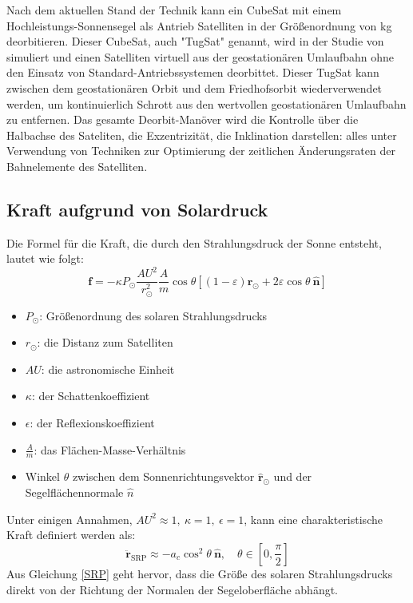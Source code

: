 Nach dem aktuellen Stand der Technik kann ein CubeSat mit einem Hochleistungs-Sonnensegel als Antrieb Satelliten in der Größenordnung von \unit[1000]{kg} deorbitieren. Dieser CubeSat, auch "TugSat" genannt, wird in der Studie  von \citet{Kelly:2018} simuliert und einen Satelliten virtuell aus der geostationären Umlaufbahn ohne den Einsatz von Standard-Antriebssystemen deorbittet. Dieser TugSat kann zwischen dem geostationären Orbit und dem Friedhofsorbit wiederverwendet werden, um kontinuierlich Schrott aus den wertvollen geostationären Umlaufbahn zu entfernen. Das gesamte Deorbit-Manöver wird die Kontrolle über die Halbachse des Sateliten, die Exzentrizität, die Inklination darstellen: alles unter Verwendung von Techniken zur Optimierung der zeitlichen Änderungsraten der Bahnelemente des Satelliten. 
\subsection{Kraft aufgrund von Solardruck}
Die Formel für die Kraft, die durch den Strahlungsdruck der Sonne entsteht, lautet wie folgt:
\begin{equation}
	\boldsymbol{f}=-\kappa P_{\odot} \frac{A U^2}{r_{\odot}^2} \frac{A}{m} \cos \theta\left[(1-\varepsilon) \hat{\boldsymbol{r}}_{\odot}+2 \varepsilon \cos \theta ~\widehat{\boldsymbol{n}}\right]
\end{equation}
\begin{itemize}
	\item $P_{\odot}$: Größenordnung des solaren Strahlungsdrucks
	\item $r_{\odot}$: die Distanz zum Satelliten
	\item $AU$: die astronomische Einheit
	\item $\kappa$: der Schattenkoeffizient
	\item $\epsilon$: der Reflexionskoeffizient
	\item $\frac{A}{m}$: das Flächen-Masse-Verhältnis
	\item Winkel $\theta$ zwischen dem Sonnenrichtungsvektor $\hat{\boldsymbol{r}}_{\odot}$ und der Segelflächennormale $\widehat{n}$
\end{itemize}
Unter einigen Annahmen, ${AU}^2\approx1,~\kappa=1,~\epsilon=1$, kann eine charakteristische Kraft definiert werden als: 
\begin{equation}
	\ddot{\boldsymbol{r}}_{\mathrm{SRP}} \approx-a_c \cos ^2 \theta ~\hat{\boldsymbol{n}}, \quad \theta \in\left[0, \frac{\pi}{2}\right]
	\label{SRP}
\end{equation}
Aus Gleichung \ref{SRP} geht hervor, dass die Größe des solaren Strahlungsdrucks direkt von der Richtung der Normalen der Segeloberfläche abhängt. 

